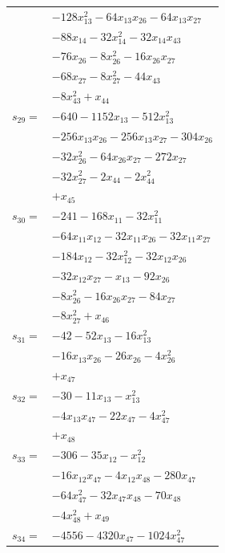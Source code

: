 \begin{longtable}{@{}r@{\;}l@{}}
 & \(\displaystyle -128x_{13}^{2} -64x_{13}x_{26} -64x_{13}x_{27}\) \\
 & \(\displaystyle -88x_{14} -32x_{14}^{2} -32x_{14}x_{43}\) \\
 & \(\displaystyle -76x_{26} -8x_{26}^{2} -16x_{26}x_{27}\) \\
 & \(\displaystyle -68x_{27} -8x_{27}^{2} -44x_{43}\) \\
 & \(\displaystyle -8x_{43}^{2} +x_{44}\) \\[3pt]
\(s_{29}=\) & \(\displaystyle -640 -1152x_{13} -512x_{13}^{2}\) \\
 & \(\displaystyle -256x_{13}x_{26} -256x_{13}x_{27} -304x_{26}\) \\
 & \(\displaystyle -32x_{26}^{2} -64x_{26}x_{27} -272x_{27}\) \\
 & \(\displaystyle -32x_{27}^{2} -2x_{44} -2x_{44}^{2}\) \\
 & \(\displaystyle +x_{45}\) \\[3pt]
\(s_{30}=\) & \(\displaystyle -241 -168x_{11} -32x_{11}^{2}\) \\
 & \(\displaystyle -64x_{11}x_{12} -32x_{11}x_{26} -32x_{11}x_{27}\) \\
 & \(\displaystyle -184x_{12} -32x_{12}^{2} -32x_{12}x_{26}\) \\
 & \(\displaystyle -32x_{12}x_{27} -x_{13} -92x_{26}\) \\
 & \(\displaystyle -8x_{26}^{2} -16x_{26}x_{27} -84x_{27}\) \\
 & \(\displaystyle -8x_{27}^{2} +x_{46}\) \\[3pt]
\(s_{31}=\) & \(\displaystyle -42 -52x_{13} -16x_{13}^{2}\) \\
 & \(\displaystyle -16x_{13}x_{26} -26x_{26} -4x_{26}^{2}\) \\
 & \(\displaystyle +x_{47}\) \\[3pt]
\(s_{32}=\) & \(\displaystyle -30 -11x_{13} -x_{13}^{2}\) \\
 & \(\displaystyle -4x_{13}x_{47} -22x_{47} -4x_{47}^{2}\) \\
 & \(\displaystyle +x_{48}\) \\[3pt]
\(s_{33}=\) & \(\displaystyle -306 -35x_{12} -x_{12}^{2}\) \\
 & \(\displaystyle -16x_{12}x_{47} -4x_{12}x_{48} -280x_{47}\) \\
 & \(\displaystyle -64x_{47}^{2} -32x_{47}x_{48} -70x_{48}\) \\
 & \(\displaystyle -4x_{48}^{2} +x_{49}\) \\[3pt]
\(s_{34}=\) & \(\displaystyle -4556 -4320x_{47} -1024x_{47}^{2}\) \\

\end{longtable}
